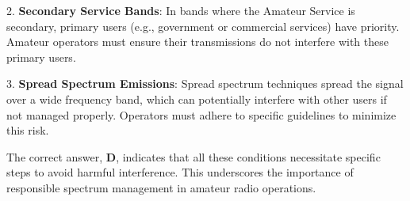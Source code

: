 2. \textbf{Secondary Service Bands}: In bands where the Amateur Service is secondary, primary users (e.g., government or commercial services) have priority. Amateur operators must ensure their transmissions do not interfere with these primary users.

3. \textbf{Spread Spectrum Emissions}: Spread spectrum techniques spread the signal over a wide frequency band, which can potentially interfere with other users if not managed properly. Operators must adhere to specific guidelines to minimize this risk.

The correct answer, \textbf{D}, indicates that all these conditions necessitate specific steps to avoid harmful interference. This underscores the importance of responsible spectrum management in amateur radio operations.


